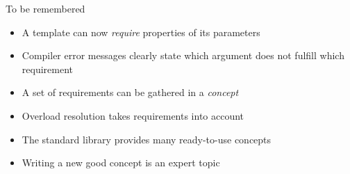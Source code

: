 \begin{frame}[fragile]
    \begin{block}{To be remembered}
      \begin{itemize}
      \item A template can now \emph{require} properties of its parameters
      \item Compiler error messages clearly state which argument does not fulfill which requirement
      \item A set of requirements can be gathered in a \emph{concept}
      \item Overload resolution takes requirements into account
      \item The standard library provides many ready-to-use concepts
      \item Writing a new good concept is an expert topic
      \end{itemize}
    \end{block}
\end{frame}
